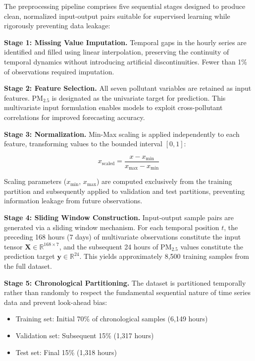 \documentclass[conference]{IEEEtran}
\begin{document}
The preprocessing pipeline comprises five sequential stages designed to produce clean, normalized input-output pairs suitable for supervised learning while rigorously preventing data leakage:

\textbf{Stage 1: Missing Value Imputation.} Temporal gaps in the hourly series are identified and filled using linear interpolation, preserving the continuity of temporal dynamics without introducing artificial discontinuities. Fewer than 1\% of observations required imputation.

\textbf{Stage 2: Feature Selection.} All seven pollutant variables are retained as input features. PM$_{2.5}$ is designated as the univariate target for prediction. This multivariate input formulation enables models to exploit cross-pollutant correlations for improved forecasting accuracy.

\textbf{Stage 3: Normalization.} Min-Max scaling is applied independently to each feature, transforming values to the bounded interval $[0, 1]$:

\begin{equation}
x_{\text{scaled}} = \frac{x - x_{\min}}{x_{\max} - x_{\min}}
\label{eq:minmax}
\end{equation}

Scaling parameters ($x_{\min}$, $x_{\max}$) are computed exclusively from the training partition and subsequently applied to validation and test partitions, preventing information leakage from future observations.

\textbf{Stage 4: Sliding Window Construction.} Input-output sample pairs are generated via a sliding window mechanism. For each temporal position $t$, the preceding 168 hours (7 days) of multivariate observations constitute the input tensor $\mathbf{X} \in \mathbb{R}^{168 \times 7}$, and the subsequent 24 hours of PM$_{2.5}$ values constitute the prediction target $\mathbf{y} \in \mathbb{R}^{24}$. This yields approximately 8,500 training samples from the full dataset.

\textbf{Stage 5: Chronological Partitioning.} The dataset is partitioned temporally rather than randomly to respect the fundamental sequential nature of time series data and prevent look-ahead bias:

\begin{itemize}
\item Training set: Initial 70\% of chronological samples (6,149 hours)
\item Validation set: Subsequent 15\% (1,317 hours)
\item Test set: Final 15\% (1,318 hours)
\end{itemize}
\end{document}
